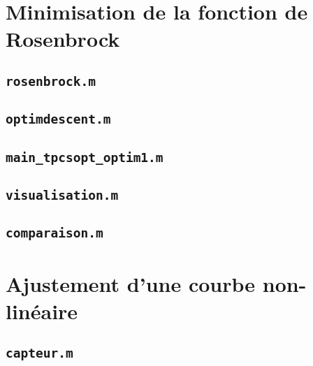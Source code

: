 \documentclass[12pt,a4paper,titlepage]{article}
\begin{document}
\begin{appendices}

    \section{Minimisation de la fonction de Rosenbrock}

    \subsection{\texttt{rosenbrock.m}}

    

    \subsection{\texttt{optimdescent.m}}

    

    \subsection{\texttt{main\_tpcsopt\_optim1.m}}

    

    \subsection{\texttt{visualisation.m}}

    

    \subsection{\texttt{comparaison.m}}

    

    \section{Ajustement d'une courbe non-linéaire}

    \subsection{\texttt{capteur.m}}

    


\end{appendices}
\end{document}
